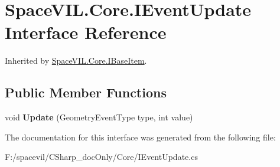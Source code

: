 \hypertarget{interface_space_v_i_l_1_1_core_1_1_i_event_update}{}\section{Space\+V\+I\+L.\+Core.\+I\+Event\+Update Interface Reference}
\label{interface_space_v_i_l_1_1_core_1_1_i_event_update}


Inherited by \mbox{\hyperlink{interface_space_v_i_l_1_1_core_1_1_i_base_item}{Space\+V\+I\+L.\+Core.\+I\+Base\+Item}}.

\subsection*{Public Member Functions}
\begin{DoxyCompactItemize}
\item 
\mbox{\label{interface_space_v_i_l_1_1_core_1_1_i_event_update_a7cef5587515d1c89297cd2848ea6ac65}} 
void {\bfseries Update} (Geometry\+Event\+Type type, int value)
\end{DoxyCompactItemize}


The documentation for this interface was generated from the following file\+:\begin{DoxyCompactItemize}
\item 
F\+:/spacevil/\+C\+Sharp\+\_\+doc\+Only/\+Core/I\+Event\+Update.\+cs\end{DoxyCompactItemize}
